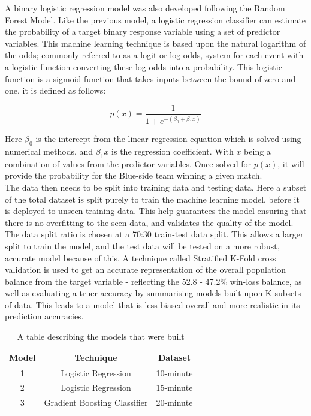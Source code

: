A binary logistic regression model was also developed following the Random Forest Model.
Like the previous model, a logistic regression classifier can estimate the probability of a target binary response variable using a set of predictor variables.
This machine learning technique is based upon the natural logarithm of the odds;
commonly referred to as a logit or log-odds, system for each event with a logistic function converting these log-odds into a probability.
This logistic function is a sigmoid function that takes inputs between the bound of zero and one, it is defined as follows:

\[ p(x) = \frac{1}{1 + e^{-(\beta_0 + \beta_1 x)}} \]

Here \(\beta_{0}\) is the intercept from the linear regression equation which is solved using numerical methods, and \(\beta_{1}x\) is the regression coefficient.
With \(x\) being a combination of values from the predictor variables.
Once solved for \(p(x)\), it will provide the probability for the Blue-side team winning a given match. \\

The data then needs to be split into training data and testing data.
Here a subset of the total dataset is split purely to train the machine learning model, before it is deployed to unseen training data.
This help guarantees the model ensuring that there is no overfitting to the seen data, and validates the quality of the model.
The data split ratio is chosen at a 70:30 train-test data split.
This allows a larger split to train the model, and the test data will be tested on a more robust, accurate model because of this.
A technique called Stratified K-Fold cross validation is used to get an accurate representation of the overall population balance from the target variable - reflecting the 52.8 - 47.2\% win-loss balance, as well as evaluating a truer accuracy by summarising models built upon K subsets of data.
This leads to a model that is less biased overall and more realistic in its prediction accuracies. \\

\begin{table}[h!]
\centering
\caption{A table describing the models that were built}
\begin{tabular}{ c c c }
 \hline
 Model & Technique & Dataset \\ [0.5ex]
 \hline
 1 & Logistic Regression & 10-minute \\
 2 & Logistic Regression & 15-minute \\
 3 & Gradient Boosting Classifier & 20-minute \\[1ex]
 \hline
\end{tabular}
\label{tab:ModelsBuilt}
\end{table}


